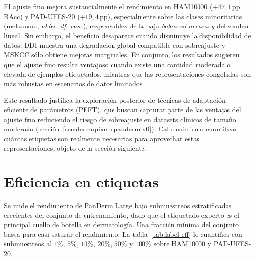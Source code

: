 El ajuste fino mejora sustancialmente el rendimiento en HAM10000
($+47{,}1$\,pp BAcc) y PAD-UFES-20 ($+19{,}4$\,pp), especialmente
sobre las clases minoritarias (melanoma, \emph{akiec}, \emph{df},
\emph{vasc}), responsables de la baja \emph{balanced accuracy} del
sondeo lineal. Sin embargo, el beneficio desaparece cuando disminuye
la disponibilidad de datos: DDI muestra una degradación global
compatible con sobreajuste y MSKCC sólo obtiene mejoras marginales. En
conjunto, los resultados sugieren que el ajuste fino resulta
ventajoso cuando existe una cantidad moderada o elevada de ejemplos
etiquetados, mientras que las representaciones congeladas son más
robustas en escenarios de datos limitados.

Este resultado justifica la exploración posterior de técnicas de
adaptación eficiente de parámetros (PEFT), que buscan capturar parte
de las ventajas del ajuste fino reduciendo el riesgo de sobreajuste en
datasets clínicos de tamaño moderado
(sección~\ref{sec:dermapixel-spanderm-v0}). Cabe asimismo cuantificar
cuántas etiquetas son realmente necesarias para aprovechar estas
representaciones, objeto de la sección siguiente.

\section{Eficiencia en etiquetas}
\label{sec:label-eff-results}

Se mide el rendimiento de PanDerm Large bajo submuestreos
estratificados crecientes del conjunto de entrenamiento, dado que el
etiquetado experto es el principal cuello de botella en dermatología.
Una fracción mínima del conjunto basta para casi saturar el
rendimiento. La tabla~\ref{tab:label-eff} lo cuantifica con
submuestreos al $1\%$,
$5\%$, $10\%$, $20\%$, $50\%$ y $100\%$ sobre HAM10000 y
PAD-UFES-20.

